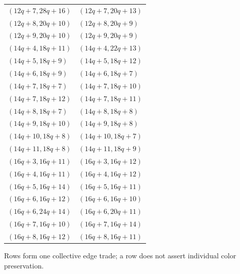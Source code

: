 \begin{longtable}{ll}
$(12q+7,28q+16)$ & $(12q+7,20q+13)$\\
$(12q+8,20q+10)$ & $(12q+8,20q+9)$\\
$(12q+9,20q+10)$ & $(12q+9,20q+9)$\\
$(14q+4,18q+11)$ & $(14q+4,22q+13)$\\
$(14q+5,18q+9)$ & $(14q+5,18q+12)$\\
$(14q+6,18q+9)$ & $(14q+6,18q+7)$\\
$(14q+7,18q+7)$ & $(14q+7,18q+10)$\\
$(14q+7,18q+12)$ & $(14q+7,18q+11)$\\
$(14q+8,18q+7)$ & $(14q+8,18q+8)$\\
$(14q+9,18q+10)$ & $(14q+9,18q+8)$\\
$(14q+10,18q+8)$ & $(14q+10,18q+7)$\\
$(14q+11,18q+8)$ & $(14q+11,18q+9)$\\
$(16q+3,16q+11)$ & $(16q+3,16q+12)$\\
$(16q+4,16q+11)$ & $(16q+4,16q+12)$\\
$(16q+5,16q+14)$ & $(16q+5,16q+11)$\\
$(16q+6,16q+12)$ & $(16q+6,16q+10)$\\
$(16q+6,24q+14)$ & $(16q+6,20q+11)$\\
$(16q+7,16q+10)$ & $(16q+7,16q+14)$\\
$(16q+8,16q+12)$ & $(16q+8,16q+11)$\\
\end{longtable}
Rows form one collective edge trade; a row does not assert individual color preservation.
